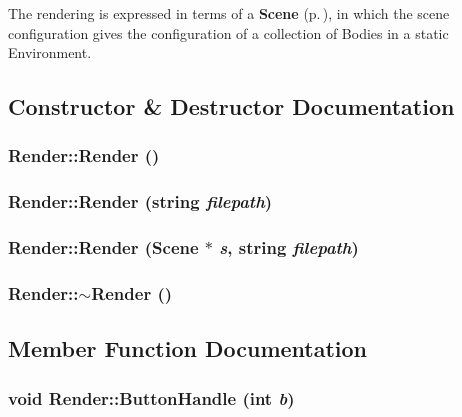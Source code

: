 The rendering is expressed in terms of a {\bf Scene} {\rm (p.\,\pageref{classScene})}, in which the  scene configuration gives the configuration of a collection of Bodies in a static Environment. 



\subsection{Constructor \& Destructor Documentation}
\subsubsection{\setlength{\rightskip}{0pt plus 5cm}Render::Render ()}\label{classRender_a0}


\subsubsection{\setlength{\rightskip}{0pt plus 5cm}Render::Render (string {\em filepath})}\label{classRender_a1}


\subsubsection{\setlength{\rightskip}{0pt plus 5cm}Render::Render ({\bf Scene} $\ast$ {\em s}, string {\em filepath})}\label{classRender_a2}


\subsubsection{\setlength{\rightskip}{0pt plus 5cm}Render::$\sim$Render ()\hspace{0.3cm}{\tt  [inline, virtual]}}\label{classRender_a3}




\subsection{Member Function Documentation}
\subsubsection{\setlength{\rightskip}{0pt plus 5cm}void Render::Button\-Handle (int {\em b})\hspace{0.3cm}{\tt  [virtual]}}\label{classRender_a13}


